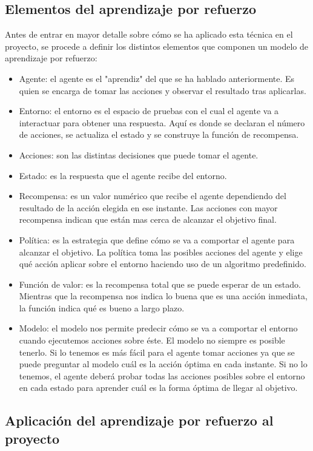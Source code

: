 \subsection{Elementos del aprendizaje por refuerzo}

Antes de entrar en mayor detalle sobre cómo se ha aplicado esta técnica en el proyecto, se procede a definir los distintos elementos que componen un modelo de aprendizaje por refuerzo:
\begin{itemize}
    \item Agente: el agente es el "aprendiz" del que se ha hablado anteriormente. Es quien se encarga de tomar las acciones y observar el resultado tras aplicarlas.
    \item Entorno: el entorno es el espacio de pruebas con el cual el agente va a interactuar para obtener una respuesta. Aquí es donde se declaran el número de acciones, se actualiza el estado y se construye la función de recompensa.
    \item Acciones: son las distintas decisiones que puede tomar el agente.
    \item Estado: es la respuesta que el agente recibe del entorno.
    \item Recompensa: es un valor numérico que recibe el agente dependiendo del resultado de la acción elegida en ese instante. Las acciones con mayor recompensa indican que están mas cerca de alcanzar el objetivo final.
    \item Política: es la estrategia que define cómo se va a comportar el agente para alcanzar el objetivo. La política toma las posibles acciones del agente y elige qué acción aplicar sobre el entorno haciendo uso de un algoritmo predefinido.
    \item Función de valor: es la recompensa total que se puede esperar de un estado. Mientras que la recompensa nos indica lo buena que es una acción inmediata, la función indica qué es bueno a largo plazo.
    \item Modelo: el modelo nos permite predecir cómo se va a comportar el entorno cuando ejecutemos acciones sobre éste. 
    El modelo no siempre es posible tenerlo. Si lo tenemos es más fácil para el agente tomar acciones ya que se puede preguntar al modelo cuál es la acción óptima en cada instante. Si no lo tenemos, el agente deberá probar todas las acciones posibles sobre el entorno en cada estado para aprender cuál es la forma óptima de llegar al objetivo.
\end{itemize}

\subsection{Aplicación del aprendizaje por refuerzo al proyecto}

